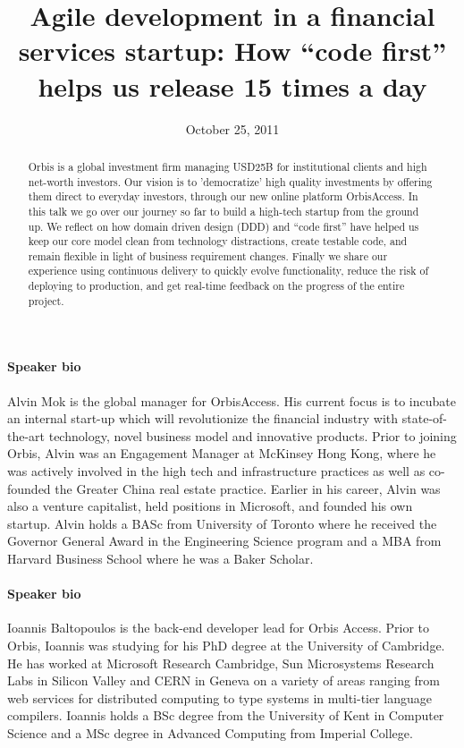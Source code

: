 \documentclass{article}
\begin{document}
\title{Agile development in a financial services startup: How ``code first''
helps us release 15 times a day}
\date{October 25, 2011}

\maketitle


\begin{abstract}
Orbis is a global investment firm managing USD25B for institutional
clients and high net-worth investors.
%
Our vision is to 'democratize' high quality investments by offering
them direct to everyday investors, through our new online platform
OrbisAccess.
%
In this talk we go over our journey so far to build a high-tech
startup from the ground up.
%
We reflect on how domain driven design (DDD) and ``code first'' have
helped us keep our core model clean from technology distractions,
create testable code, and remain flexible in light of business
requirement changes.
%
Finally we share our experience using continuous delivery to quickly
evolve functionality, reduce the risk of deploying to production, and
get real-time feedback on the progress of the entire project.
\end{abstract}




\paragraph{Speaker bio} 
Alvin Mok is the global manager for OrbisAccess. 
%
His current focus is to incubate an internal start-up which will
revolutionize the financial industry with state-of-the-art technology,
novel business model and innovative products.
%
Prior to joining Orbis, Alvin was an Engagement Manager at McKinsey
Hong Kong, where he was actively involved in the high tech and
infrastructure practices as well as co-founded the Greater China real
estate practice.
%
Earlier in his career, Alvin was also a venture capitalist, held
positions in Microsoft, and founded his own startup.
%
Alvin holds a BASc from University of Toronto where he received the
Governor General Award in the Engineering Science program and a MBA
from Harvard Business School where he was a Baker Scholar.

\paragraph{Speaker bio}
Ioannis Baltopoulos is the back-end developer lead for Orbis Access.
%
Prior to Orbis, Ioannis was studying for his PhD degree at the
University of Cambridge.
%
He has worked at Microsoft Research Cambridge, Sun Microsystems
Research Labs in Silicon Valley and CERN in Geneva on a variety of
areas ranging from web services for distributed computing to type
systems in multi-tier language compilers.
%
Ioannis holds a BSc degree from the University of Kent in Computer
Science and a MSc degree in Advanced Computing from Imperial College.
\end{document}
